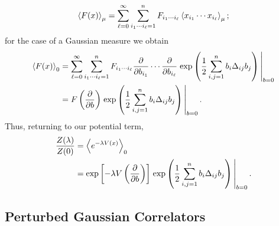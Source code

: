 \documentclass{article}
\numberwithin{equation}{section}
\begin{document}
\begin{equation}
    \ev{F(x)}_\mu = \sum_{\ell = 0}^\infty \sum_{i_1 \cdots i_\ell = 1}^n F_{i_1 \cdots i_\ell} \ev{x_{i_1} \cdots x_{i_\ell}}_\mu;
\end{equation}
for the case of a Gaussian measure we obtain
\begin{equation}
\begin{aligned}
    \ev{F(x)}_0 &= \sum_{\ell = 0}^\infty \sum_{i_1 \cdots i_\ell = 1}^n F_{i_1 \cdots i_\ell} \pdv{b_{i_1}} \cdots \pdv{b_{i_\ell}} \eval{\exp\left(\frac{1}{2}\sum_{i,j=1}^n b_i \Delta_{ij} b_j\right)}_{b=0} \\
    &= F \left(\pdv{b}\right) \eval{\exp\left(\frac{1}{2}\sum_{i,j=1}^n b_i \Delta_{ij} b_j\right)}_{b=0}.
\end{aligned}
\end{equation}
Thus, returning to our potential term,
\begin{equation} \label{eq:z0/zlambda}
\begin{aligned}
    \frac{Z(\lambda)}{Z(0)} &= \ev{e^{-\lambda V(x)}}_0 \\
    &= \exp\left[-\lambda V\left(\pdv{b}\right)\right] \eval{\exp\left(\frac{1}{2}\sum_{i,j=1}^n b_i \Delta_{ij} b_j\right)}_{b=0}.
\end{aligned}
\end{equation}


\subsection{Perturbed Gaussian Correlators}
\end{document}
